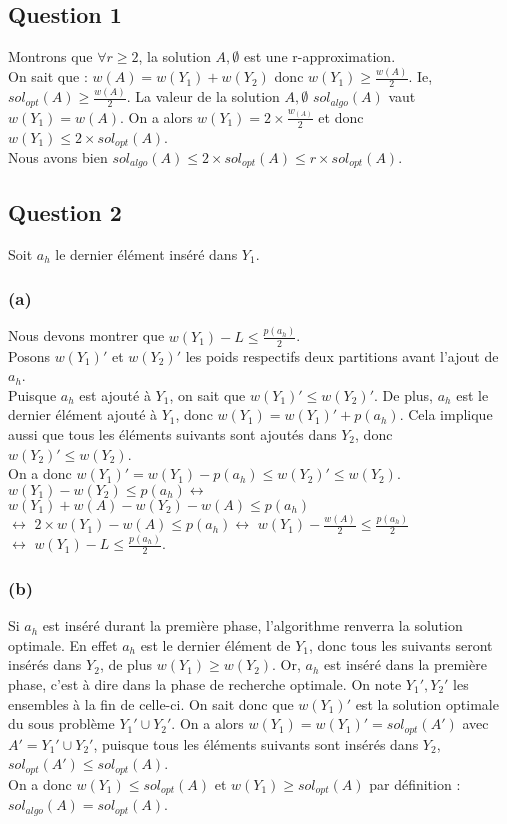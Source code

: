 \subsection{Question 1}\label{ex5_q1}
Montrons que $\forall r \geq 2$, la solution $A,\emptyset$ est une r-approximation.\\
On sait que : $w(A) = w(Y_1) + w(Y_2)$ donc $w(Y_1) \geq \frac{w(A)}{2}$. Ie,
$sol_{opt}(A) \geq \frac{w(A)}{2}$.
La valeur de la solution $A,\emptyset$ $sol_{algo}(A)$ vaut $w(Y_1) = w(A)$.
On a alors $w(Y_1) = 2 \times \frac{w_(A)}{2}$ et donc $w(Y_1) \leq 2 \times
sol_{opt}(A)$.\\
Nous avons bien $sol_{algo}(A) \leq 2 \times sol_{opt}(A) \leq r \times sol_{opt}(A)$.

\subsection{Question 2}\label{ex5_q2}
Soit $a_h$ le dernier \'el\'ement ins\'er\'e dans $Y_1$.\\

\subsubsection{(a)}\label{ex5_q2_a}
Nous devons montrer que $w(Y_1) - L \leq \frac{p(a_h)}{2}$.\\
Posons $w(Y_1)'$ et $w(Y_2)'$ les poids respectifs deux partitions avant l'ajout de
$a_h$.\\
Puisque $a_h$ est ajout\'e \`a $Y_1$, on sait que $w(Y_1)' \leq w(Y_2)'$.
De plus, $a_h$ est le dernier \'el\'ement ajout\'e \`a $Y_1$, donc $w(Y_1) = w(Y_1)' +
p(a_h)$.
Cela implique aussi que tous les \'el\'ements suivants sont ajoutés dans $Y_2$, donc
$w(Y_2)' \leq w(Y_2)$.\\
On a donc $w(Y_1)' = w(Y_1) - p(a_h) \leq w(Y_2)' \leq w(Y_2)$.\\
$w(Y_1) - w(Y_2) \leq p(a_h) \leftrightarrow$
$w(Y_1) + w(A) - w(Y_2) - w(A) \leq p(a_h)$\\
$\leftrightarrow$
$2 \times w(Y_1) - w(A) \leq p(a_h) \leftrightarrow$
$w(Y_1) - \frac{w(A)}{2} \leq \frac{p(a_h)}{2}$\\
$\leftrightarrow$
$w(Y_1) - L \leq \frac{p(a_h)}{2}$.

\subsubsection{(b)}\label{ex5_q2_b}
Si $a_h$ est ins\'er\'e durant la première phase, l'algorithme renverra la solution
optimale. En effet $a_h$ est le dernier élément de $Y_1$, donc tous les suivants seront
insérés dans $Y_2$, de plus $w(Y_1) \geq w(Y_2)$.
Or, $a_h$ est inséré dans la première phase, c'est à dire dans la phase de recherche
optimale. On note $Y_1',Y_2'$ les ensembles à la fin de celle-ci.
On sait donc que $w(Y_1)'$ est la solution optimale du sous problème $Y_1' \cup
Y_2'$.
On a alors $w(Y_1) = w(Y_1)' = sol_{opt}(A')$ avec $A' = Y_1' \cup Y_2'$, puisque tous
les éléments suivants sont insérés dans $Y_2$, $sol_{opt}(A') \leq sol_{opt}(A)$.\\
On a donc $w(Y_1) \leq sol_{opt}(A)$ et $w(Y_1) \geq sol_{opt}(A)$ par définition :
$sol_{algo}(A) = sol_{opt}(A)$.

